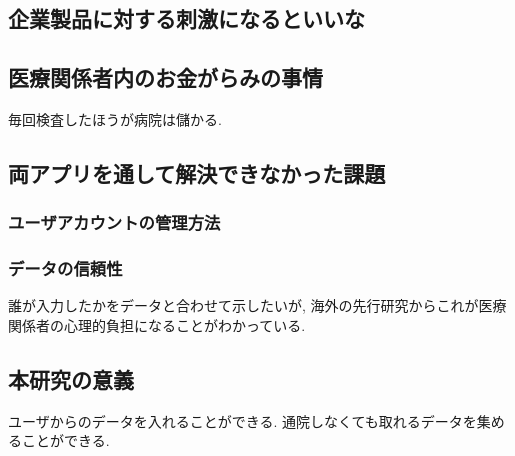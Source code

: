 \subsection{企業製品に対する刺激になるといいな}

\subsection{医療関係者内のお金がらみの事情}
  毎回検査したほうが病院は儲かる.

\subsection{両アプリを通して解決できなかった課題}
\subsubsection{ユーザアカウントの管理方法}
\subsubsection{データの信頼性}
   誰が入力したかをデータと合わせて示したいが,
   海外の先行研究からこれが医療関係者の心理的負担になることがわかっている.

\subsection{本研究の意義}
  ユーザからのデータを入れることができる.
  通院しなくても取れるデータを集めることができる.
